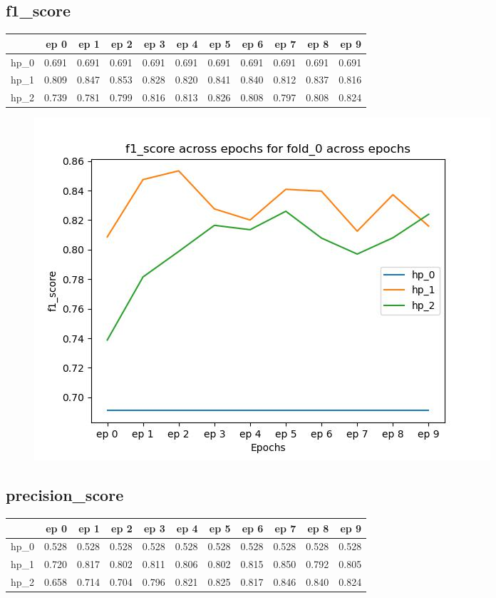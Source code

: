 \documentclass{article}
\begin{document}
\subsection{f1\_score}
\begin{tabular}{lrrrrrrrrrr}
\toprule
{} &   ep 0 &   ep 1 &   ep 2 &   ep 3 &   ep 4 &   ep 5 &   ep 6 &   ep 7 &   ep 8 &   ep 9 \\
\midrule
hp\_0 &  0.691 &  0.691 &  0.691 &  0.691 &  0.691 &  0.691 &  0.691 &  0.691 &  0.691 &  0.691 \\
hp\_1 &  0.809 &  0.847 &  0.853 &  0.828 &  0.820 &  0.841 &  0.840 &  0.812 &  0.837 &  0.816 \\
hp\_2 &  0.739 &  0.781 &  0.799 &  0.816 &  0.813 &  0.826 &  0.808 &  0.797 &  0.808 &  0.824 \\
\bottomrule
\end{tabular}

\begin{figure}[H]
\includegraphics[scale = 0.75]{fold_0/f1_score}
\end{figure}
\subsection{precision\_score}
\begin{tabular}{lrrrrrrrrrr}
\toprule
{} &   ep 0 &   ep 1 &   ep 2 &   ep 3 &   ep 4 &   ep 5 &   ep 6 &   ep 7 &   ep 8 &   ep 9 \\
\midrule
hp\_0 &  0.528 &  0.528 &  0.528 &  0.528 &  0.528 &  0.528 &  0.528 &  0.528 &  0.528 &  0.528 \\
hp\_1 &  0.720 &  0.817 &  0.802 &  0.811 &  0.806 &  0.802 &  0.815 &  0.850 &  0.792 &  0.805 \\
hp\_2 &  0.658 &  0.714 &  0.704 &  0.796 &  0.821 &  0.825 &  0.817 &  0.846 &  0.840 &  0.824 \\
\bottomrule
\end{tabular}
\end{document}
